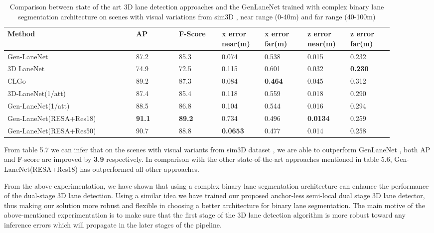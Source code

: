         \begin{table}[h]
    \centering
    \caption{Comparison between state of the art 3D lane detection approaches and the GenLaneNet \cite{guo2020gen} trained with complex binary lane segmentation architecture on scenes with visual variations from sim3D \cite{guo2020gen}, near range (0-40m) and far range (40-100m)}
    \begin{tabular}{|p{0.3\linewidth}|p{0.1\linewidth}|p{0.1\linewidth}|p{0.1\linewidth}|p{0.1\linewidth}|p{0.1\linewidth}|p{0.1\linewidth}|}
    \hline
        \textbf{Method} & \textbf{AP} & \textbf{F-Score} & \textbf{x error near(m)} & \textbf{x error far(m)} & \textbf{z error near(m)} & \textbf{z error far(m)} \\ \hline
        Gen-LaneNet\cite{guo2020gen} & 87.2 & 85.3 & 0.074 & 0.538 & 0.015 & 0.232 \\ \hline
        3D LaneNet\cite{DBLP:journals/corr/abs-1811-10203} & 74.9 & 72.5 & 0.115 & 0.601 & 0.032 & \textbf{0.230} \\ \hline
        CLGo \cite{DBLP:journals/corr/abs-2112-15351}& 89.2 & 87.3 & 0.084 & \textbf{0.464} & 0.045 & 0.312 \\ \hline
        3D-LaneNet(1/att) \cite{9506296} & 87.4 & 85.4 & 0.118 & 0.559 & 0.018 & 0.290 \\ \hline
        Gen-LaneNet(1/att) \cite{9506296}& 88.5 & 86.8 & 0.104 & 0.544 & 0.016 & 0.294 \\ \hline
        Gen-LaneNet(RESA+Res18) & \textbf{ 91.1} &\textbf{ 89.2} & 0.734 & 0.496 & \textbf{0.0134} & 0.259 \\ \hline
        Gen-LaneNet(RESA+Res50) & 90.7 & 88.8 & \textbf{0.0653} & 0.477 & 0.014 & 0.258 \\ \hline
    \end{tabular}
\end{table}

 From table 5.7 we can infer that on the scenes with visual variants from sim3D dataset \cite{guo2020gen}, we are able to outperform GenLaneNet \cite{guo2020gen}, both AP and F-score are improved by \textbf{3.9} respectively. In comparison with the other state-of-the-art approaches mentioned in table 5.6, Gen-LaneNet(RESA+Res18) has outperformed all other approaches.
 
 From the above experimentation, we have shown that using a complex binary lane segmentation architecture can enhance the performance of the dual-stage 3D lane detection. Using a similar idea we have trained our proposed anchor-less semi-local dual stage 3D lane detector, thus making our solution more robust and flexible in choosing a better architecture for binary lane segmentation. The main motive of the above-mentioned experimentation is to make sure that the first stage of the 3D lane detection algorithm is more robust toward any inference errors which will propagate in the later stages of the pipeline. 

